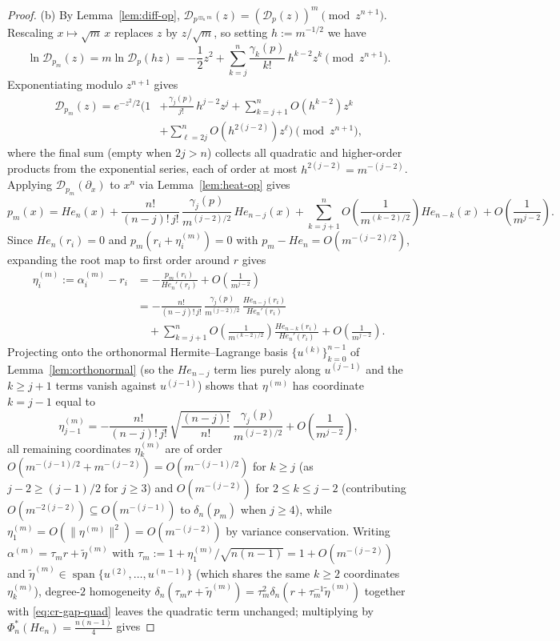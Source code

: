 \documentclass[11pt,a4paper]{article}
\theoremstyle{definition}
\DeclareMathOperator{\Span}{span}
\newcommand{\boxplusn}{\boxplus_n}
\begin{document}
\begin{proof}
(b) By Lemma~\ref{lem:diff-op}, $\mathcal{D}_{p^{\boxplusn m}}(z) = (\mathcal{D}_p(z))^m \pmod{z^{n+1}}$. Rescaling $x \mapsto \sqrt{m}\, x$ replaces $z$ by $z/\sqrt{m}$, so setting $h := m^{-1/2}$ we have
\[
\ln \mathcal{D}_{p_m}(z) = m \ln \mathcal{D}_p(h z) = -\frac{1}{2} z^2 + \sum_{k=j}^n \frac{\gamma_k(p)}{k!}\, h^{k-2} z^k \pmod{z^{n+1}}.
\]
Exponentiating modulo $z^{n+1}$ gives
\begin{align*}
\mathcal{D}_{p_m}(z) = e^{-z^2/2} \Bigg( 1 &+ \frac{\gamma_j(p)}{j!}\, h^{j-2} z^j + \sum_{k=j+1}^{n} O(h^{k-2}) z^k \\
&+ \sum_{\ell=2j}^{n} O(h^{2(j-2)}) z^\ell \Bigg) \pmod{z^{n+1}},
\end{align*}
where the final sum (empty when $2j > n$) collects all quadratic and higher-order products from the exponential series, each of order at most $h^{2(j-2)} = m^{-(j-2)}$. Applying $\mathcal{D}_{p_m}(\partial_x)$ to $x^n$ via Lemma~\ref{lem:heat-op} gives
\[
p_m(x) = He_n(x) + \frac{n!}{(n-j)!\, j!}\,\frac{\gamma_j(p)}{m^{(j-2)/2}}\, He_{n-j}(x) + \sum_{k=j+1}^n O\!\left(\frac{1}{m^{(k-2)/2}}\right) He_{n-k}(x) + O\!\left(\frac{1}{m^{j-2}}\right).
\]
Since $He_n(r_i) = 0$ and $p_m(r_i + \eta^{(m)}_i) = 0$ with $p_m - He_n = O(m^{-(j-2)/2})$, expanding the root map to first order around $r$ gives
\begin{align*}
\eta^{(m)}_i := \alpha^{(m)}_i - r_i &= -\frac{p_m(r_i)}{He_n'(r_i)} + O\!\left(\frac{1}{m^{j-2}}\right) \\
&= -\frac{n!}{(n-j)!\,j!}\,\frac{\gamma_j(p)}{m^{(j-2)/2}}\,\frac{He_{n-j}(r_i)}{He_n'(r_i)} \\
&\quad + \sum_{k=j+1}^n O\!\left(\frac{1}{m^{(k-2)/2}}\right)\frac{He_{n-k}(r_i)}{He_n'(r_i)} + O\!\left(\frac{1}{m^{j-2}}\right).
\end{align*}
Projecting onto the orthonormal Hermite--Lagrange basis $\{u^{(k)}\}_{k=0}^{n-1}$ of Lemma~\ref{lem:orthonormal} (so the $He_{n-j}$ term lies purely along $u^{(j-1)}$ and the $k \ge j+1$ terms vanish against $u^{(j-1)}$) shows that $\eta^{(m)}$ has coordinate $k = j-1$ equal to
\[
\eta^{(m)}_{j-1} = -\frac{n!}{(n-j)!\,j!}\,\sqrt{\frac{(n-j)!}{n!}}\,\frac{\gamma_j(p)}{m^{(j-2)/2}} + O\!\left(\frac{1}{m^{j-2}}\right),
\]
all remaining coordinates $\eta^{(m)}_k$ are of order $O(m^{-(j-1)/2} + m^{-(j-2)}) = O(m^{-(j-1)/2})$ for $k \ge j$ (as $j-2 \ge (j-1)/2$ for $j \ge 3$) and $O(m^{-(j-2)})$ for $2 \le k \le j-2$ (contributing $O(m^{-2(j-2)}) \subseteq O(m^{-(j-1)})$ to $\delta_n(p_m)$ when $j \ge 4$), while $\eta^{(m)}_1 = O(\|\eta^{(m)}\|^2) = O(m^{-(j-2)})$ by variance conservation. Writing $\alpha^{(m)} = \tau_m r + \tilde{\eta}^{(m)}$ with $\tau_m := 1 + \eta^{(m)}_1/\sqrt{n(n-1)} = 1 + O(m^{-(j-2)})$ and $\tilde{\eta}^{(m)} \in \Span\{u^{(2)},\dots,u^{(n-1)}\}$ (which shares the same $k \ge 2$ coordinates $\eta^{(m)}_k$), degree-$2$ homogeneity $\delta_n(\tau_m r + \tilde{\eta}^{(m)}) = \tau_m^2 \delta_n(r + \tau_m^{-1}\tilde{\eta}^{(m)})$ together with \eqref{eq:cr-gap-quad} leaves the quadratic term unchanged; multiplying by $\Phi_n^*(He_n) = \frac{n(n-1)}{4}$ gives

\end{proof}
\end{document}
